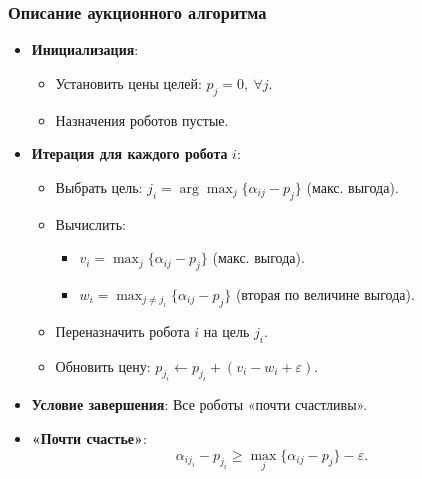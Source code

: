 \documentclass{beamer}
\begin{document}
	
	\begin{frame}
		\frametitle{Описание аукционного алгоритма}
			
			\begin{itemize}
				\item \textbf{Инициализация}: 
				\begin{itemize}
					\item Установить цены целей: \( p_j = 0, \ \forall j \).
					\item Назначения роботов пустые.
				\end{itemize}
				\item \textbf{Итерация для каждого робота} \( i \):
				\begin{itemize}
					\item Выбрать цель: \( j_i = \arg\max_j \{\alpha_{ij} - p_j\} \) (макс. выгода).
					\item Вычислить: 
					\begin{itemize}
						\item \( v_i = \max_j \{\alpha_{ij} - p_j\} \) (макс. выгода).
						\item \( w_i = \max_{j \neq j_i} \{\alpha_{ij} - p_j\} \) (вторая по величине выгода).
					\end{itemize}
					\item Переназначить робота \( i \) на цель \( j_i \).
					\item Обновить цену: \( p_{j_i} \gets p_{j_i} + (v_i - w_i + \varepsilon) \).
				\end{itemize}
				\item \textbf{Условие завершения}: Все роботы «почти счастливы».
				\item \textbf{«Почти счастье»}: 
				\[ \alpha_{i j_i} - p_{j_i} \geq \max_j \{\alpha_{ij} - p_j\} - \varepsilon.\]
			\end{itemize}
	\end{frame}
\end{document}
